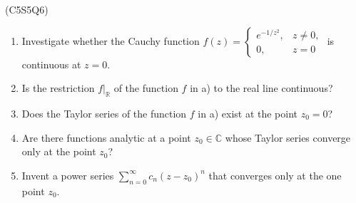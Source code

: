 \begin{prb}
    (C5S5Q6) 
    \begin{enumerate}
        \item[a)] Investigate whether the Cauchy function $f(z) = \begin{cases} e^{-1/z^2}, & z \neq 0, \\ 0, & z = 0 \end{cases}$ is continuous at $z = 0$.
        \item[b)] Is the restriction $f| _{\mathbb{R}}$ of the function $f$ in a) to the real line continuous?
        \item[c)] Does the Taylor series of the function $f$ in a) exist at the point $z_0 = 0$?
        \item[d)] Are there functions analytic at a point $z_0 \in \mathbb{C}$ whose Taylor series converge only at the point $z_0$?
        \item[e)] Invent a power series $\sum_{n=0}^{\infty} c_n (z - z_0)^n$ that converges only at the one point $z_0$.
    \end{enumerate}
\end{prb}

